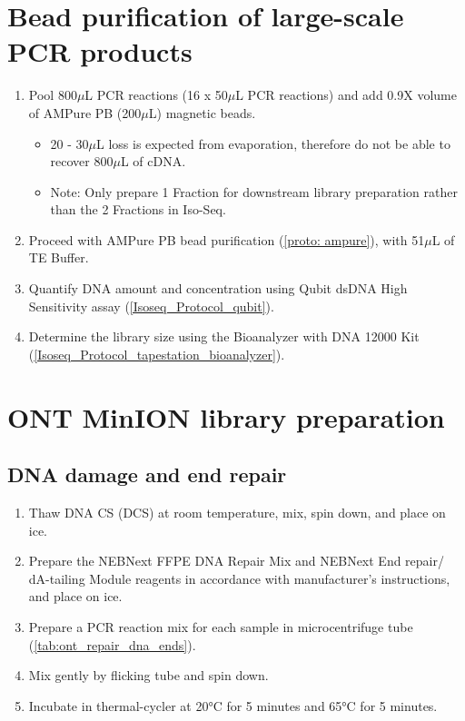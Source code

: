 \section{Bead purification of large-scale PCR products}
\label{ONT_Protocol_Bead_Purification}
\begin{enumerate}
	\item Pool 800$\mu$L PCR reactions (16 x 50$\mu$L PCR reactions) and add 0.9X volume of AMPure PB (200$\mu$L) magnetic beads. 
	\begin{itemize}
		\item 20 - 30$\mu$L loss is expected from evaporation, therefore do not be able to recover 800$\mu$L of cDNA.
		\item Note: Only prepare 1 Fraction for downstream library preparation rather than the 2 Fractions in Iso-Seq.
	\end{itemize}
	\item Proceed with AMPure PB bead purification (\cref{proto: ampure}), with 51$\mu$L of TE Buffer.
	\item Quantify DNA amount and concentration using Qubit dsDNA High Sensitivity assay (\cref{Isoseq_Protocol_qubit}).
	\item Determine the library size using the Bioanalyzer with DNA 12000 Kit (\cref{Isoseq_Protocol_tapestation_bioanalyzer}). 
\end{enumerate}

\section{ONT MinION library preparation}
\subsection{DNA damage and end repair}
\begin{enumerate}
	\item Thaw DNA CS (DCS) at room temperature, mix, spin down, and place on ice.
	\item Prepare the NEBNext FFPE DNA Repair Mix and NEBNext End repair/ dA-tailing Module reagents in accordance with manufacturer’s instructions, and place on ice.
	\item Prepare a PCR reaction mix for each sample in microcentrifuge tube (\cref{tab:ont_repair_dna_ends}).
	\item Mix gently by flicking tube and spin down. 
	\item Incubate in thermal-cycler at 20°C for 5 minutes and 65°C for 5 minutes.
\end{enumerate}

